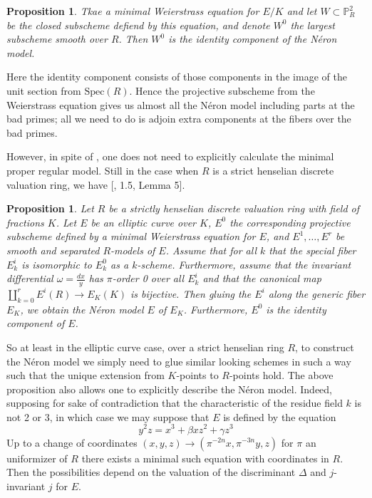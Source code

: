 \documentclass{article}
\theoremstyle{definition}
\theoremstyle{remark}
\theoremstyle{plain}
\newtheorem{proposition}[theorem]{Proposition}
\newcommand{\mb}[1]{\mathbb{#1}}
\begin{document}
\begin{proposition}
	Tkae a minimal Weierstrass equation for $E/K$ and let $W \subset \mb{P}^2_R$ be the closed subscheme defiend by this equation, and denote $W^0$ the largest subscheme smooth over $R$.
	Then $W^0$ is the identity component of the N\'eron model.
\end{proposition}

Here the identity component consists of those components in the image of the unit section from $\text{Spec}(R)$. 
Hence the projective subscheme from the Weierstrass equation gives us almost all the N\'eron model including parts at the bad primes; all we need to do is adjoin extra components at the fibers over the bad primes. 
\newline

\indent However, in spite of , one does not need to explicitly calculate the minimal proper regular model.
Still in the case when $R$ is a strict henselian discrete valuation ring, we have [\cite{BLR}, 1.5, Lemma 5].

\begin{proposition}\label{prop:4.2}
	Let $R$ be a strictly henselian discrete valuation ring with field of fractions $K$.
	Let $E$ be an elliptic curve over $K$, $E^0$ the corresponding projective subscheme defined by a minimal Weierstrass equation for $E$, and $E^1, \dots, E^r$ be smooth and separated $R$-models of $E$.
Assume that for all $k$ that the special fiber $E_k^i$ is isomorphic to $E^0_k$ as a $k$-scheme. 
Furthermore, assume that the invariant differential $\omega = \frac{dx}{y}$ has $\pi$-order 0 over all $E^i_k$ and that the canonical map $\coprod_{k=0}^r E^i(R) \to E_K(K)$ is bijective.
Then gluing the $E^i$ along the generic fiber $E_K$, we obtain the N\'eron model $E$ of $E_K$.
Furthermore, $E^0$ is the identity component of $E$.
\end{proposition}

So at least in the elliptic curve case, over a strict henselian ring $R$, to construct the N\'eron model we simply need to glue similar looking schemes in such a way such that the unique extension from $K$-points to $R$-points hold.
The above proposition also allows one to explicitly describe the N\'eron model.
Indeed, supposing for sake of contradiction that the  characteristic of the residue field $k$ is not 2 or 3, in which case we may suppose that $E$ is defined by the equation
\[y^2z = x^3 + \beta xz^2 + \gamma z^3\]
Up to a change of coordinates $(x,y,z) \to (\pi^{-2n}x, \pi^{-3n}y, z)$ for $\pi$ an uniformizer of $R$ there exists a minimal such equation with coordinates in $R$.
Then the possibilities depend on the valuation of the discriminant $\Delta$ and $j$-invariant $j$ for $E$.  \newline
\end{document}

